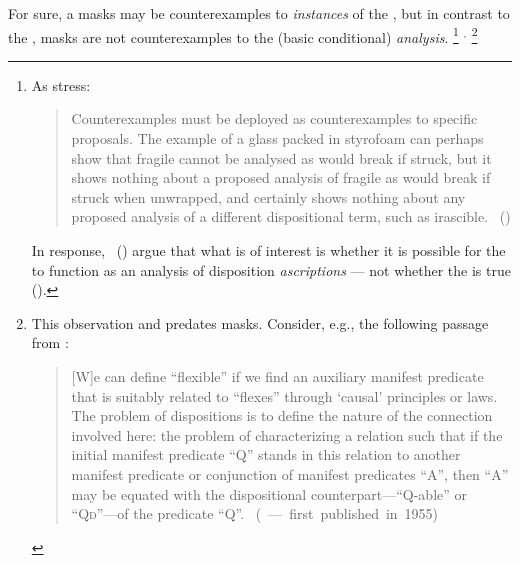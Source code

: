 \begin{note}
  For sure, a masks may be counterexamples to \emph{instances} of the \dBCAa{}, but in contrast to the \dSCAa{}, masks are not counterexamples to the (basic conditional) \emph{analysis}.%
  \footnote{
    As \citeauthor{Bonevac:2011tz} stress:
    \begin{quote}
      Counterexamples must be deployed as counterexamples to specific proposals.
      The example of a glass packed in styrofoam can perhaps show that fragile cannot be analysed as would break if struck, but it shows nothing about a proposed analysis of fragile as would break if struck when unwrapped, and certainly shows nothing about any proposed analysis of a different dispositional term, such as irascible.%
      \mbox{ }\hfill\mbox{(\citeyear[1144]{Bonevac:2011tz})}
    \end{quote}
    \nocite{Manley:2007aa}
    In response,~\citeauthor{Manley:2011aa} (\citeyear{Manley:2011aa}) argue that what is of interest is whether it is possible for the  to function as an analysis of disposition \emph{ascriptions} --- not whether the  is true (\citeyear[cf.][\S1.3]{Manley:2011aa}).
  }%
  \(^{,}\)%
  \footnote{
    This observation and predates masks.
    Consider, e.g., the following passage from \citeauthor{Goodman:1983aa}:

    \begin{quote}
      [W]e can define ``flexible'' if we find an auxiliary manifest predicate that is suitably related to ``flexes'' through `causal' principles or laws.
      The problem of dispositions is to define the nature of the connection involved here:
      the problem of characterizing a relation such that if the initial manifest predicate ``Q'' stands in this relation to another manifest predicate or conjunction of manifest predicates ``A'', then ``A'' may be equated with the dispositional counterpart---``Q-able'' or ``Q\textsc{d}''---of the predicate ``Q''.\nolinebreak
      \mbox{ }\hfill\mbox{(\citeyear[45]{Goodman:1983aa} --- first published in 1955)}
    \end{quote}
  }
\end{note}



